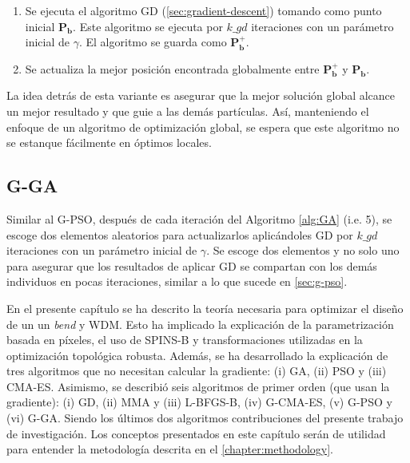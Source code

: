 \begin{enumerate}
  \item Se ejecuta el algoritmo GD (\autoref{sec:gradient-descent}) tomando como punto inicial
       $\boldsymbol{P_{b}}$. Este algoritmo se ejecuta por $k\_gd$ iteraciones con un 
       parámetro inicial de $\gamma$. El algoritmo se guarda como $\boldsymbol{P_{b}^{+}}$. 
  \item Se actualiza la mejor posición encontrada globalmente entre $\boldsymbol{P_{b}^{+}}$ y 
       $\boldsymbol{P_{b}}$.
\end{enumerate}

La idea detrás de esta variante es asegurar que la mejor solución global alcance un mejor resultado
y que guie a las demás partículas.
Así, manteniendo el enfoque de un algoritmo de optimización global, se espera que este algoritmo
no se estanque fácilmente en óptimos locales.


\subsection{G-GA}\label{sec:g-ga}

Similar al G-PSO, después de cada iteración del Algoritmo \ref{alg:GA} (i.e. 5), se escoge dos
elementos aleatorios para actualizarlos aplicándoles GD por $k\_gd$ iteraciones con un parámetro inicial
de $\gamma$.
Se escoge dos elementos y no solo uno para asegurar que los resultados de aplicar GD
se compartan con los demás individuos en pocas iteraciones, similar a lo que sucede en \autoref{sec:g-pso}.


En el presente capítulo se ha descrito la teoría necesaria para optimizar el diseño de un
un \emph{bend} y WDM.
Esto ha implicado la explicación de la parametrización basada en píxeles,
el uso de SPINS-B y transformaciones utilizadas en la optimización topológica robusta.
Además, se ha desarrollado la explicación de tres algoritmos que no necesitan calcular la gradiente:
(i) GA, (ii) PSO y (iii) CMA-ES. Asimismo, se describió seis algoritmos de primer orden 
(que usan la gradiente): (i) GD, (ii) MMA y (iii) L-BFGS-B, (iv) G-CMA-ES, (v) G-PSO y (vi) G-GA.
Siendo los últimos dos algoritmos contribuciones del presente trabajo de investigación.
Los conceptos presentados en este capítulo serán de utilidad para entender la metodología descrita en el
\autoref{chapter:methodology}.
